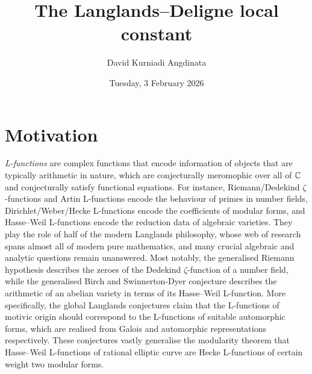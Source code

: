 \def\type{}

\title{The Langlands--Deligne local constant}
\author{David Kurniadi Angdinata}
\date{Tuesday, 3 February 2026}



\maketitle

\section{Motivation}

\emph{L-functions} are complex functions that encode information of objects that are typically arithmetic in nature, which are conjecturally meromophic over all of $ \mathbb{C} $ and conjecturally satisfy functional equations. For instance, Riemann/Dedekind $ \zeta $-functions and Artin L-functions encode the behaviour of primes in number fields, Dirichlet/Weber/Hecke L-functions encode the coefficients of modular forms, and Hasse--Weil L-functions encode the reduction data of algebraic varieties. They play the role of half of the modern Langlands philosophy, whose web of research spans almost all of modern pure mathematics, and many crucial algebraic and analytic questions remain unanswered. Most notably, the generalised Riemann hypothesis describes the zeroes of the Dedekind $ \zeta $-function of a number field, while the generalised Birch and Swinnerton-Dyer conjecture describes the arithmetic of an abelian variety in terms of its Hasse--Weil L-function. More specifically, the global Langlands conjectures claim that the L-functions of motivic origin should correspond to the L-functions of suitable automorphic forms, which are realised from Galois and automorphic representations respectively. These conjectures vastly generalise the modularity theorem that Hasse--Weil L-functions of rational elliptic curve are Hecke L-functions of certain weight two modular forms.

